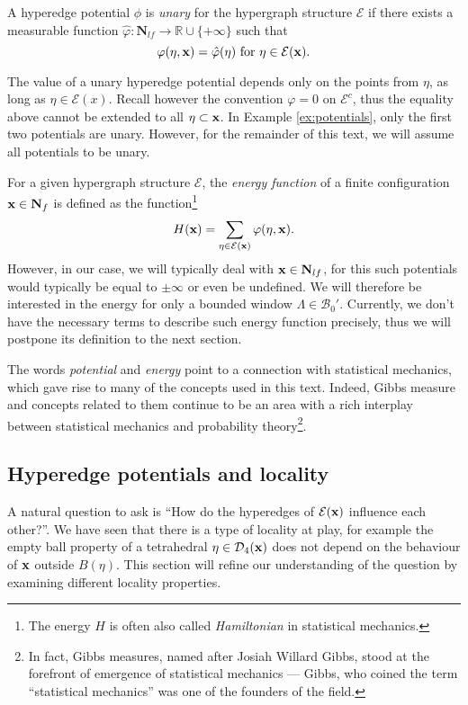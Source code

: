 \begin{definition}
	A hyperedge potential $\phi$ is \textit{unary} for the hypergraph structure $\mathcal E$ if there exists a measurable function $\hat\varphi:\mathbf N_{lf} \to \mathbb R \cup \{+\infty\}$ such that
	$$\varphi(\eta,{\mathbf{x}}) = \hat\varphi(\eta) \text{ for } \eta \in \mathcal E({\mathbf{x}}).$$
\end{definition}
The value of a unary hyperedge potential depends only on the points from $\eta$, as long as $\eta \in \mathcal E(x)$.  Recall however the convention $\varphi=0$ on $\mathcal E^c$, thus the equality above cannot be extended to all $\eta\subset {\mathbf{x}}$. 
In Example \ref{ex:potentials}, only the first two potentials are unary. However, for the remainder of this text, we will assume all potentials to be unary.\newline


For a given hypergraph structure $\mathcal E$, the \textit{energy function} of a finite configuration ${\mathbf{x}}\in \mathbf N_{f}$ is defined as the function\footnote{The energy $H$ is often also called \textit{Hamiltonian} in statistical mechanics.}
$$H({\mathbf{x}}) = \sum_{\eta \in \mathcal E({\mathbf{x}})} \varphi(\eta,{\mathbf{x}}).$$
However, in our case, we will typically deal with ${\mathbf{x}}\in \mathbf N_{lf}$, for this such potentials would typically be equal to $\pm \infty$ or even be undefined. We will therefore be interested in the energy for only a bounded window $\Lambda \in \mathcal B_0'$. Currently, we don't have the necessary terms to describe such energy function precisely, thus we will postpone its definition to the next section. 

The words \textit{potential} and \textit{energy} point to a connection with statistical mechanics, which gave rise to many of the concepts used in this text. Indeed, Gibbs measure and concepts related to them continue to be an area with a rich interplay between statistical mechanics and probability theory\footnote{In fact, Gibbs measures, named after Josiah Willard Gibbs, stood at the forefront of emergence of statistical mechanics --- Gibbs, who coined the term ``statistical mechanics'' was one of the founders of the field.}.




\subsection{Hyperedge potentials and locality}
A natural question to ask is ``How do the hyperedges of $\mathcal E({\mathbf{x}})$ influence each other?''. We have seen that there is a type of locality at play, for example  the empty ball property of a tetrahedral $\eta\in\mathcal D_4({\mathbf{x}})$ does not depend on the behaviour of ${\mathbf{x}}$ outside $B(\eta)$. This section will refine our understanding of the question by examining different locality properties.

